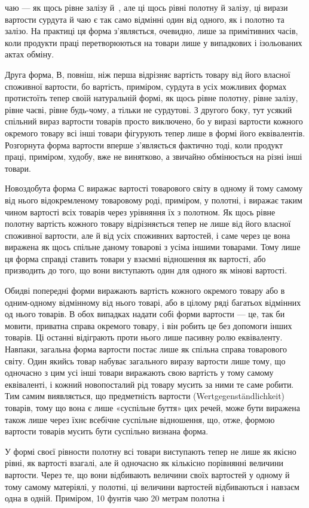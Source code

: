 \parcont{}  %
чаю — як щось рівне залізу й~, але ці щось рівні полотну
й залізу, ці вирази вартости сурдута й чаю є так само відмінні
один від одного, як і полотно та залізо. На практиці ця форма
з’являється, очевидно, лише за примітивних часів, коли продукти
праці перетворюються на товари лише у випадкових і ізольованих
актах обміну.

Друга форма, В, повніш, ніж перша відрізняє вартість товару від
його власної споживної вартости, бо вартість, приміром, сурдута
в усіх можливих формах протистоїть тепер своїй натуральній
формі, як щось рівне полотну, рівне залізу, рівне чаєві, рівне
будь-чому, а тільки не сурдутові. З другого боку, тут усякий
спільний вираз вартости товарів просто виключено, бо у виразі
вартости кожного окремого товару всі інші товари фігурують
тепер лише в формі його еквівалентів. Розгорнута форма вартости
вперше з’являється фактично тоді, коли продукт праці, приміром,
худобу, вже не винятково, а звичайно обмінюється на різні інші
товари.

Новоздобута форма С виражає вартості товарового світу в
одному й тому самому від нього відокремленому товаровому роді,
приміром, у полотні, і виражає таким чином вартості всіх товарів
через урівняння їх з полотном. Як щось рівне полотну вартість
кожного товару відрізняється тепер не лише від його власної
споживної вартости, але й від усіх споживних вартостей, і саме
через це вона виражена як щось спільне даному товарові з усіма
іншими товарами. Тому лише ця форма справді ставить товари у
взаємні відношення як вартості, або призводить до того, що вони
виступають один для одного як мінові вартості.

Обидві попередні форми виражають вартість кожного окремого
товару або в одним-одному відмінному від нього товарі, або в
цілому ряді багатьох відмінних од нього товарів. В обох випадках
надати собі форми вартости — це, так би мовити, приватна справа
окремого товару, і він робить це без допомоги інших товарів. Ці
останні відіграють проти нього лише пасивну ролю еквіваленту.
Навпаки, загальна форма вартости постає лише як спільна справа
товарового світу. Один якийсь товар набуває загального виразу
вартости лише тому, що одночасно з цим усі інші товари виражають
свою вартість у тому самому еквіваленті, і кожний новопосталий
рід товару мусить за ними те саме робити. Тим самим виявляється,
що предметність вартости (Wertgegenständlichkeit)
товарів, тому що вона є лише «суспільне буття» цих речей, може
бути виражена також лише через їхнє всебічне суспільне відношення,
що, отже, формою вартости товарів мусить бути суспільно
визнана форма.

У формі своєї рівности полотну всі товари виступають тепер
не лише як якісно рівні, як вартості взагалі, але й одночасно як
кількісно порівнянні величини вартости. Через те, що вони відбивають
величини своїх вартостей у одному й тому самому матеріялі,
у полотні, ці величини вартостей відбиваються і навзаєм
одна в одній. Приміром, 10 фунтів чаю \deq{} 20 метрам полотна і
\parbreak{}  %
